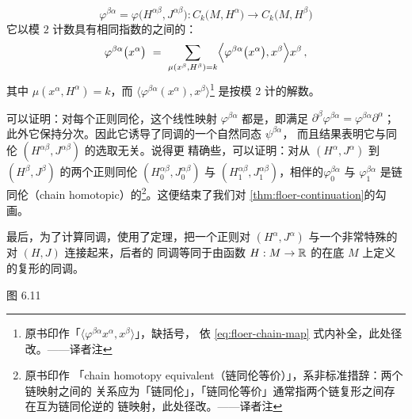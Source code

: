 \[
\varphi^{\beta\alpha}=\varphi\bigl(H^{\alpha\beta},J^{\alpha\beta}\bigr):C_{k}\bigl(M,H^{\alpha}\bigr)\longrightarrow C_{k}\bigl(M,H^{\beta}\bigr)
\]
它以模 $2$ 计数具有相同指数的\trPeriodicSolution{}之间的\trConnectingOrbit：
\begin{equation}\label{eq:floer-chain-map}
\varphi^{\beta\alpha}\bigl(x^{\alpha}\bigr)\ =\ \sum_{\mu(x^{\beta},H^{\beta})=k}\Bigl\langle\varphi^{\beta\alpha}\bigl(x^{\alpha}\bigr),x^{\beta}\Bigr\rangle x^{\beta}\,,
\end{equation}
其中 $\mu(x^{\alpha},H^{\alpha})=k$，而%
$\bigl\langle\varphi^{\beta\alpha}(x^{\alpha}),x^{\beta}\bigr\rangle$\footnote{%
原书印作「$\langle\varphi^{\beta\alpha}x^{\alpha},x^{\beta}\rangle$」，缺括号，%
依 \eqref{eq:floer-chain-map} 式内补全，此处径改。——译者注} 是按模%
$2$ 计的解数。

可以证明：对每个正则同伦，这个线性映射 $\varphi^{\beta\alpha}$ 都是\trChainMap，即满足 $\partial^{\beta}\varphi^{\beta\alpha}=\varphi^{\beta\alpha}\partial^{\alpha}$；%
此外它保持分次。因此它诱导了\trFloer{}同调的一个自然同态 $\psi^{\beta\alpha}$，%
而且结果表明它与同伦 $(H^{\alpha\beta},J^{\alpha\beta})$ 的选取无关。说得更%
精确些，可以证明：对从 $(H^{\alpha},J^{\alpha})$ 到 $(H^{\beta},J^{\beta})$%
的两个正则同伦 $(H_{0}^{\alpha\beta},J_{0}^{\alpha\beta})$ 与%
$(H_{1}^{\alpha\beta},J_{1}^{\alpha\beta})$，相伴的\trChainMap $\varphi_{0}^{\beta\alpha}$%
与 $\varphi_{1}^{\beta\alpha}$ 是链同伦（chain homotopic）的\footnote{原书印作%
「chain homotopy equivalent（链同伦等价）」，系非标准措辞：两个链映射之间的%
关系应为「链同伦」，「链同伦等价」通常指两个链复形之间存在互为链同伦逆的%
链映射，此处径改。——译者注}。这便结束了我们对%
\cref{thm:floer-continuation}的勾画。

最后，为了计算同调，\trFloer{}使用了\trContinuation{}定理，把一个正则对%
$(H^{\alpha},J^{\alpha})$ 与一个非常特殊的对 $(H,J)$ 连接起来，后者的%
\trFloer{}同调等同于由函数 $H:M\to\mathbb{R}$ 的\trGradient\trFlow{}在底\trManifold{}%
$M$ 上定义的\trMorse{}复形的同调。

\noindent\begin{minipage}{\linewidth}
\centering
{}

图 6.11
\end{minipage}

